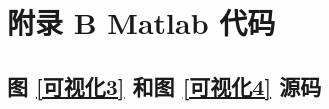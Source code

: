 \documentclass[UTF8]{report}
\theoremstyle{MyLineTheoremStyle} %
\theoremstyle{MyBlockTheoremStyle} %
\theoremstyle{MySubsubsectionStyle} %
\begin{document}
\chapter*{附录 B\hspace*{20pt}  Matlab 代码}
\thispagestyle{fancy}
\setcounter{chapter}{2} 
\setcounter{equation}{0}    %
\setcounter{section}{0}   
\renewcommand\thesection{B.\arabic{section}}   
\renewcommand{\thefigure}{B.\arabic{figure}} 
\renewcommand{\thetable}{B.\arabic{table}}

\section{图 \ref{可视化3} 和图 \ref{可视化4} 源码}
\label{可视化34 源码}


\end{document}
